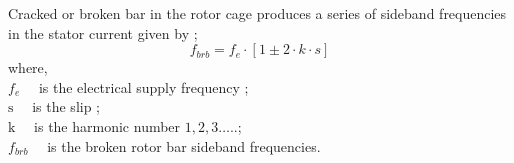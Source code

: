 Cracked or broken bar in the rotor cage produces a series of sideband frequencies in the stator current given by \cite{karmakar2016induction};
\begin{equation}
	f_{brb}=f_{e} \cdot\left[1 \pm 2\cdot k\cdot s \right]
	\label{rotorfault}
\end{equation}
where,\\
$f_{e} \quad$ is the electrical supply frequency ;\\
$\mathrm{s} \quad$ is the slip ;\\
$\mathrm{k} \quad$ is the harmonic number $1,2,3 \ldots$..;\\
$f_{brb} \quad$ is the broken rotor bar sideband frequencies.


	
	  
